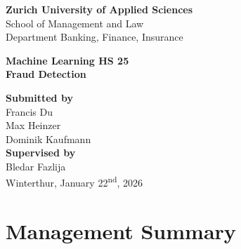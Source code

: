 \documentclass[oneside,12pt,parskip=half,american,numbers=noenddot]{scrreprt}
\renewcommand*{\chapterpagestyle}{frontmatter} %
\begin{document}
\begin{titlepage}
    \thispagestyle{empty} %
    \centering
    \vspace*{1.8cm} %

    {\large
    \textbf{Zurich University of Applied Sciences} \\
    School of Management and Law \\
    \vspace{0.4cm}
    Department Banking, Finance, Insurance \\
    }

    \vfill

    {\Large \textbf{Machine Learning HS 25}} \\[1.0cm]

    {\LARGE\bfseries
    Fraud Detection
    }

    \vfill

    {\large
    \textbf{Submitted by} \\[0.3cm]
    Francis Du \\
    Max Heinzer \\
    Dominik Kaufmann \\[1.2cm]

    \textbf{Supervised by} \\[0.3cm]
    Bledar Fazlija \\[1.4cm]

    Winterthur, January 22\textsuperscript{nd}, 2026
    }

    \vspace*{1.2cm} %
\end{titlepage}

\setcounter{page}{1}

\pagestyle{frontmatter}
\renewcommand*{\chapterpagestyle}{frontmatter}

\onehalfspacing

\chapter*{Management Summary}
\thispagestyle{frontmatter}
\end{document}
